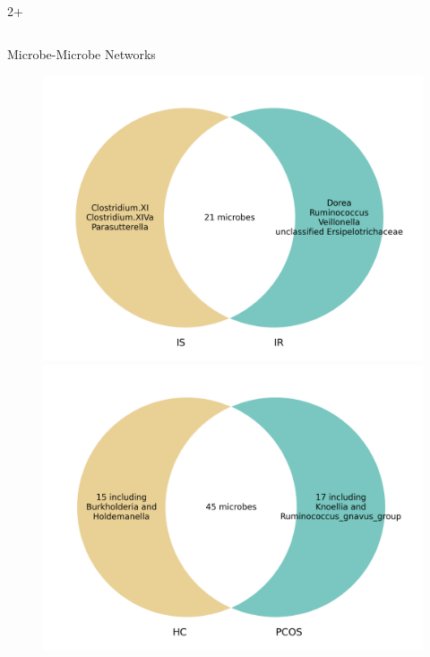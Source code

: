 \documentclass[final]{beamer}
\newlength{\sepwidth}
\newlength{\colwidth}
\begin{document}
\begin{frame}[t]
\begin{columns}[t]
\begin{column}{2\colwidth + \sepwidth}
\begin{columns}[t]
\begin{column}{\colwidth}
\begin{block}{Microbe-Microbe Networks}
        \begin{figure}
          \centering
          \begin{minipage}{0.45\linewidth}
            \centering
            \includegraphics[width=\linewidth]{t2d_microbe_microbe_venn.png}
          \end{minipage}%
          \begin{minipage}{0.45\linewidth}
            \centering
            \includegraphics[width=\linewidth]{pcos_microbe_microbe_venn.png}
          \end{minipage}
        \end{figure}
        

\end{block}
\end{column}
\end{columns}
\end{column}
\end{columns}
\end{frame}
\end{document}
